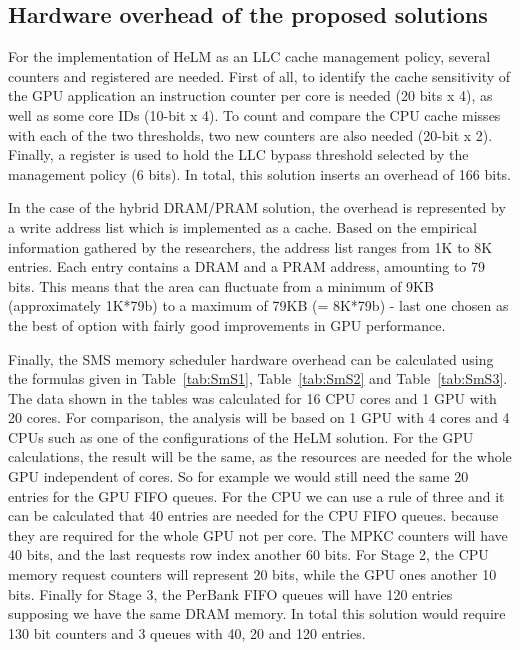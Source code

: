 \documentclass[12pt,journal,compsoc]{IEEEtran}
\begin{document}
\subsection{Hardware overhead of the proposed solutions}
For the implementation of HeLM as an LLC cache management policy, several counters and registered are needed. First of all, to identify the cache sensitivity of the GPU application an instruction counter per core is needed (20 bits x 4), as well as some core IDs (10-bit x 4). To count and compare the CPU cache misses with each of the two thresholds, two new counters are also needed (20-bit x 2). Finally, a register is used to hold the LLC bypass threshold selected by the management policy (6 bits). In total, this solution inserts an overhead of 166 bits.

In the case of the hybrid DRAM/PRAM solution, the overhead is represented by a write address list which is implemented as a cache. Based on the empirical information gathered by the researchers, the address list ranges from 1K to 8K entries. Each entry contains a DRAM and a PRAM address, amounting to 79 bits. This means that the area can fluctuate from a minimum of 9KB (approximately 1K*79b) to a maximum of 79KB (= 8K*79b) - last one chosen as the best of option with fairly good improvements in GPU performance.

Finally, the SMS memory scheduler hardware overhead can be calculated using the formulas given in Table~\ref{tab:SmS1}, Table~\ref{tab:SmS2} and Table~\ref{tab:SmS3}. The data shown in the tables was calculated for 16 CPU cores and 1 GPU with 20 cores. For comparison, the analysis will be based on 1 GPU with 4 cores and 4 CPUs such as one of the configurations of the HeLM solution. For the GPU calculations, the result will be the same, as the resources are needed for the whole GPU independent of cores. So for example we would still need the same 20 entries for the GPU FIFO queues. For the CPU we can use a rule of three and it can be calculated that 40 entries are needed for the CPU FIFO queues. because they are required for the whole GPU not per core. The MPKC counters will have 40 bits, and the last requests row index another 60 bits. For Stage 2, the CPU memory request counters will represent 20 bits, while the GPU ones another 10 bits. Finally for Stage 3, the PerBank FIFO queues will have 120 entries supposing we have the same DRAM memory. In total this solution would require 130 bit counters and 3 queues with 40, 20 and 120 entries.
\end{document}
